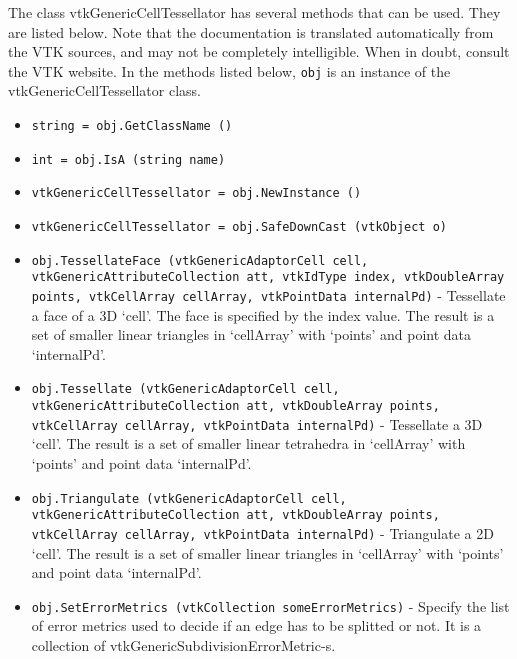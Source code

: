 The class vtkGenericCellTessellator has several methods that can be used.
  They are listed below.
Note that the documentation is translated automatically from the VTK sources,
and may not be completely intelligible.  When in doubt, consult the VTK website.
In the methods listed below, \verb|obj| is an instance of the vtkGenericCellTessellator class.
\begin{itemize}
\item  \verb|string = obj.GetClassName ()|

\item  \verb|int = obj.IsA (string name)|

\item  \verb|vtkGenericCellTessellator = obj.NewInstance ()|

\item  \verb|vtkGenericCellTessellator = obj.SafeDownCast (vtkObject o)|

\item  \verb|obj.TessellateFace (vtkGenericAdaptorCell cell, vtkGenericAttributeCollection att, vtkIdType index, vtkDoubleArray points, vtkCellArray cellArray, vtkPointData internalPd)| -  Tessellate a face of a 3D `cell'. The face is specified by the
 index value.
 The result is a set of smaller linear triangles in `cellArray' with
 `points' and point data `internalPd'.
 
 
 
 
 
 
 

\item  \verb|obj.Tessellate (vtkGenericAdaptorCell cell, vtkGenericAttributeCollection att, vtkDoubleArray points, vtkCellArray cellArray, vtkPointData internalPd)| -  Tessellate a 3D `cell'. The result is a set of smaller linear
 tetrahedra in `cellArray' with `points' and point data `internalPd'.
 
 
 
 
 
 

\item  \verb|obj.Triangulate (vtkGenericAdaptorCell cell, vtkGenericAttributeCollection att, vtkDoubleArray points, vtkCellArray cellArray, vtkPointData internalPd)| -  Triangulate a 2D `cell'. The result is a set of smaller linear triangles
 in `cellArray' with `points' and point data `internalPd'.
 
 
 
 
 
 

\item  \verb|obj.SetErrorMetrics (vtkCollection someErrorMetrics)| -  Specify the list of error metrics used to decide if an edge has to be
 splitted or not. It is a collection of vtkGenericSubdivisionErrorMetric-s.


\end{itemize}
